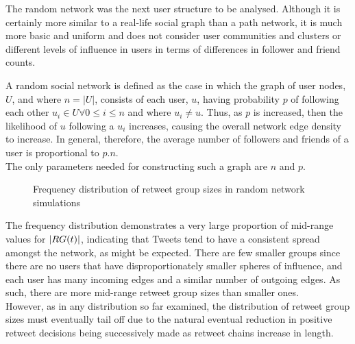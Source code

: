 The random network was the next user structure to be analysed. Although it is certainly more similar to a real-life social graph than a path network, it is much more basic and uniform and does not consider user communities and clusters or different levels of influence in users in terms of differences in follower and friend counts.

A random social network is defined as the case in which the graph of user nodes, $U$, and where $n = |U|$, consists of each user, $u$, having probability $p$ of following each other $u_i \in U \forall 0 \leq i \leq n$ and where $u_i \neq u$. Thus, as $p$ is increased, then the likelihood of $u$ following a $u_i$ increases, causing the overall network edge density to increase. In general, therefore, the average number of followers and friends of a user is proportional to $p.n$.\\
The only parameters needed for constructing such a graph are $n$ and $p$.

\begin{figure}[h]
\centering
{}
\caption{Frequency distribution of retweet group sizes in random network simulations}
\label{fig:random}
\end{figure}

The frequency distribution demonstrates a very large proportion of mid-range values for $|RG(t)|$, indicating that Tweets tend to have a consistent spread amongst the network, as might be expected. There are few smaller groups since there are no users that have disproportionately smaller spheres of influence, and each user has many incoming edges and a similar number of outgoing edges. As such, there are more mid-range retweet group sizes than smaller ones.\\
However, as in any distribution so far examined, the distribution of retweet group sizes must eventually tail off due to the natural eventual reduction in positive retweet decisions being successively made as retweet chains increase in length.


